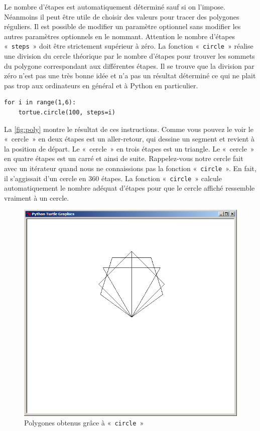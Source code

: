 Le nombre d'étapes est automatiquement déterminé sauf si on l'impose. Néanmoins il peut être utile de choisir des valeurs pour tracer des polygones réguliers. Il est possible de modifier un paramètre optionnel sans modifier les autres paramètres optionnels en le nommant. Attention le nombre d'étapes «~\texttt{steps}~» doit être strictement supérieur à zéro. La fonction «~\texttt{circle}~» réalise une division du cercle théorique par le nombre d'étapes pour trouver les sommets du polygone correspondant aux différentes étapes. Il se trouve que la division par zéro n'est pas une très bonne idée et n'a pas un résultat déterminé ce qui ne plait pas trop aux ordinateurs en général et à Python en particulier.

\begin{Verbatim}[frame=single,rulecolor=\color{mbleu}, label=à taper]
for i in range(1,6):
	tortue.circle(100, steps=i)
\end{Verbatim}


La \autoref{fig:poly} montre le résultat de ces instructions. 
Comme vous pouvez le voir le «~cercle~» en deux étapes est un aller-retour, qui dessine un segment et revient à la position de départ.
Le «~cercle~» en trois étapes est un triangle. Le «~cercle~» en quatre étapes est un carré et ainsi de suite. 
Rappelez-vous notre cercle fait avec un itérateur quand nous ne connaissions pas la fonction «~\texttt{circle}~».
En fait, il s'aggissait d'un cercle en 360 étapes. La fonction «~\texttt{circle}~» calcule automatiquement le nombre adéquat d'étapes pour que le cercle affiché ressemble vraiment à un cercle.

\begin{figure}[H]
\centering
\includegraphics[scale=0.4]{images/poly}
\caption{Polygones obtenus grâce à «~\texttt{circle}~»}\label{fig:poly}
\end{figure}

